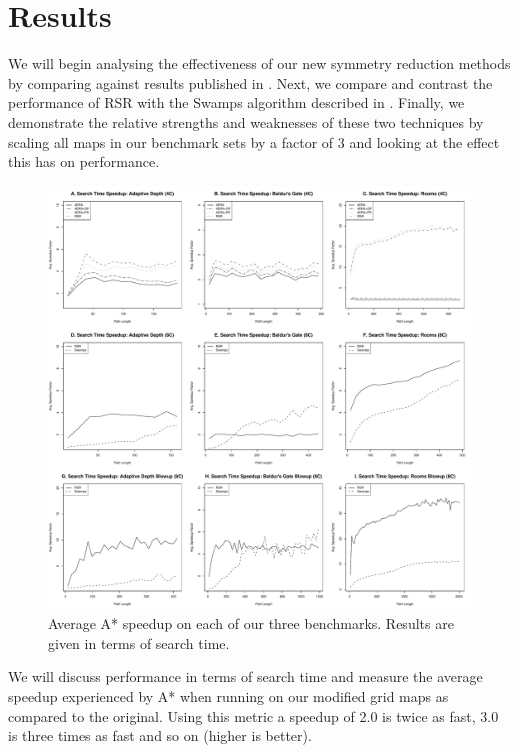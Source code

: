 \section{Results}
\label{sec-results}
%
We will begin analysing the effectiveness of our new symmetry
reduction methods by comparing against results published in 
\cite{harabor10}. 
Next, we compare and contrast the performance of RSR with
the Swamps algorithm described in \cite{pochter10}.
Finally, we demonstrate the relative strengths and weaknesses of these two
techniques by scaling all maps in our benchmark sets by a factor of 3 and looking
at the effect this has on performance.

\begin{figure}[t]
       \begin{center}
                       \includegraphics[width=1.95\columnwidth, trim = 10mm 10mm 10mm 0mm]{diagrams/speedup.pdf}
       \end{center}
       \caption{Average A* speedup on each of our three benchmarks. 
		Results are given in terms of search time.}
\label{fig-speedup}
\end{figure}

We will discuss performance in terms of search time and measure
the average speedup experienced by A* when running on our modified 
grid maps as compared to the original. Using this metric
a speedup of 2.0 is twice as fast, 3.0 is three times as fast and so on
(higher is better).


